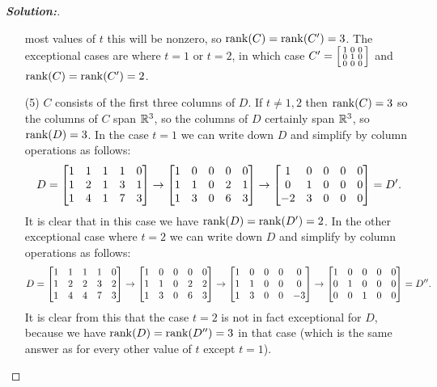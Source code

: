 \documentclass[a4paper]{amsart}
\theoremstyle{definition}
\newenvironment{solution}{\begin{proof}[\textbf{Solution:}] \vphantom{u}}{\end{proof}}
\begin{document}
\begin{solution}
\begin{itemize}
   most values of $t$ this will be nonzero, so $\operatorname{rank}(C)=\operatorname{rank}(C')=3$.
   The exceptional cases are where $t=1$ or $t=2$, in which case
   $C'=\left[\begin{smallmatrix} 1&0&0 \\ 0&1&0\\ 0&0&0\end{smallmatrix}\right]$ and $\operatorname{rank}(C)=\operatorname{rank}(C')=2$.
  \item[(5)] $C$ consists of the first three columns of $D$.  If
   $t\neq 1,2$ then $\operatorname{rank}(C)=3$ so the columns of $C$ span ${\mathbb{R}}^3$, so
   the columns of $D$ certainly span ${\mathbb{R}}^3$, so $\operatorname{rank}(D)=3$.  In the
   case $t=1$ we can write down $D$ and simplify by column operations
   as follows:
   \[ D = \left[\begin{matrix} 1 & 1 & 1 & 1 & 0 \\
               1 & 2 & 1 & 3 & 1 \\
               1 & 4 & 1 & 7 & 3 \end{matrix}\right] \to
          \left[\begin{matrix} 1 & 0 & 0 & 0 & 0 \\
               1 & 1 & 0 & 2 & 1 \\
               1 & 3 & 0 & 6 & 3 \end{matrix}\right] \to
          \left[\begin{matrix} 1 & 0 & 0 & 0 & 0 \\
               0 & 1 & 0 & 0 & 0 \\
              -2 & 3 & 0 & 0 & 0 \end{matrix}\right]
        = D'.
   \]
   It is clear that in this case we have $\operatorname{rank}(D)=\operatorname{rank}(D')=2$.  In the
   other exceptional case where $t=2$ we can write down $D$ and
   simplify by column operations as follows:
   \[ D = \left[\begin{matrix} 1 & 1 & 1 & 1 & 0 \\
               1 & 2 & 2 & 3 & 2 \\
               1 & 4 & 4 & 7 & 3 \end{matrix}\right] \to
          \left[\begin{matrix} 1 & 0 & 0 & 0 & 0 \\
               1 & 1 & 0 & 2 & 2 \\
               1 & 3 & 0 & 6 & 3 \end{matrix}\right] \to
          \left[\begin{matrix} 1 & 0 & 0 & 0 & 0 \\
               1 & 1 & 0 & 0 & 0 \\
               1 & 3 & 0 & 0 &-3 \end{matrix}\right] \to
          \left[\begin{matrix} 1 & 0 & 0 & 0 & 0 \\
               0 & 1 & 0 & 0 & 0 \\
               0 & 0 & 1 & 0 & 0 \end{matrix}\right]
        = D''.
   \]
   It is clear from this that the case $t=2$ is not in fact
   exceptional for $D$, because we have $\operatorname{rank}(D)=\operatorname{rank}(D'')=3$ in that
   case (which is the same answer as for every other value of $t$
   except $t=1$).
 \end{itemize}
\end{solution}
\end{document}
